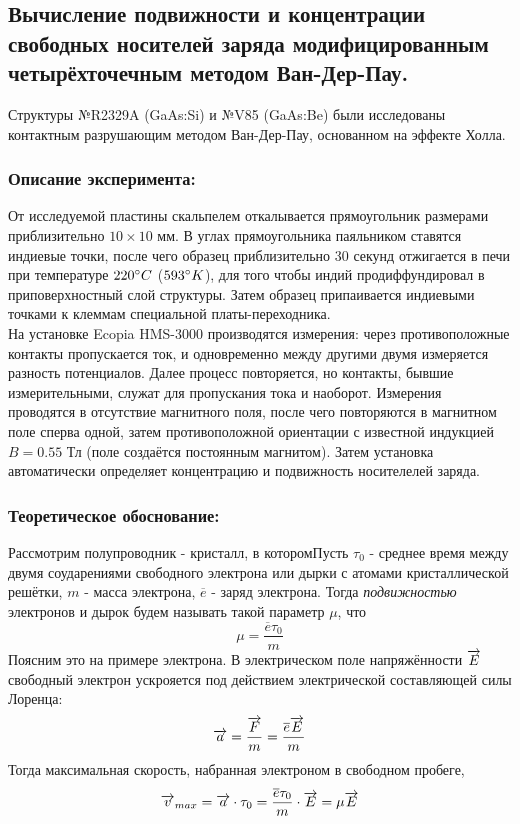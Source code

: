 \documentclass[../FinalReport.tex]{subfiles}
\begin{document}
\subsection{Вычисление подвижности и концентрации свободных носителей заряда модифицированным четырёхточечным методом Ван-Дер-Пау.}

Структуры №R2329A (GaAs:Si) и №V85 (GaAs:Be) были исследованы контактным разрушающим методом Ван-Дер-Пау, основанном на эффекте Холла.\\

\subsubsection{Описание эксперимента:}
От исследуемой пластины скальпелем откалывается прямоугольник размерами приблизительно $10\times10$ мм. В углах прямоугольника паяльником ставятся индиевые точки, после чего образец приблизительно 30 секунд отжигается в печи при температуре $220\degree\-C$ ($593\degree\-K$), для того чтобы индий продиффундировал в приповерхностный слой структуры. Затем образец припаивается индиевыми точками к клеммам специальной платы-переходника.\\
На установке Ecopia HMS-3000 производятся измерения: через противоположные контакты пропускается ток, и одновременно между другими двумя измеряется разность потенциалов. Далее процесс повторяется, но контакты, бывшие измерительными, служат для пропускания тока и наоборот. Измерения проводятся в отсутствие магнитного поля, после чего повторяются в магнитном поле сперва одной, затем противоположной ориентации с известной индукцией $B=0.55$ Тл (поле создаётся постоянным магнитом). Затем установка автоматически определяет концентрацию и подвижность носителелей заряда.

\subsubsection{Теоретическое обоснование:}
Рассмотрим полупроводник - кристалл, в которомПусть $\tau_0$ - среднее время между двумя соударениями свободного электрона или дырки с атомами кристаллической решётки, $m$ - масса электрона, $\overline{e}$ - заряд электрона. Тогда \emph{подвижностью} электронов и дырок будем называть такой параметр $\mu$, что
\begin{equation}
\mu=\frac{\overline{e}\tau_0}{m}
\end{equation}
Поясним это на примере электрона. В электрическом поле напряжённости $\overrightarrow{E}$ свободный электрон  ускрояется под действием электрической составляющей силы Лоренца:
$$\overrightarrow{a}=\frac{\overrightarrow{F}}{m}=\frac{\overline{e}\overrightarrow{E}}{m}$$
Тогда максимальная скорость, набранная электроном в свободном пробеге,
$$\overrightarrow{v}_{max}=\overrightarrow{a}\cdot\tau_0=\frac{\overline{e}\tau_0}{m}\cdot\overrightarrow{E}=\mu\overrightarrow{E}$$
\end{document}
